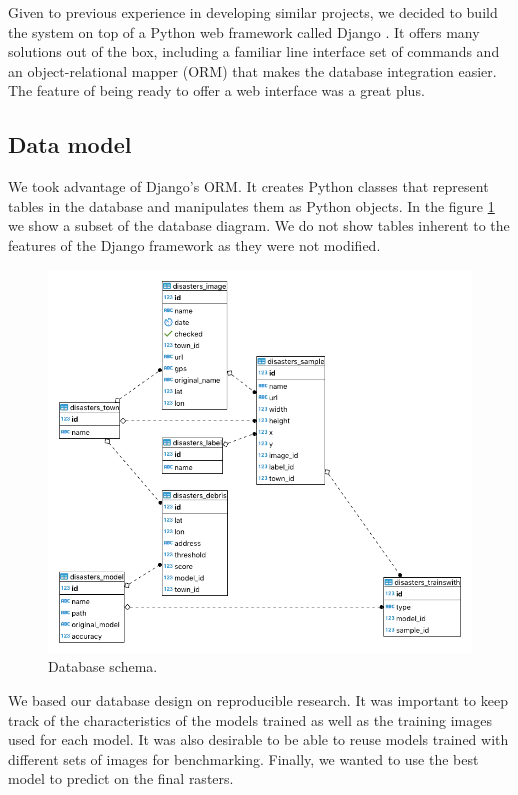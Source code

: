 Given to previous experience in developing similar projects, we decided to build the system on top of a Python web framework called Django \cite{django}. It offers many solutions out of the box, including a familiar line interface set of commands and an object-relational mapper (ORM) that makes the database integration easier. The feature of being ready to offer a web interface was a great plus.\\


\subsection{Data model}

We took advantage of Django's ORM. It creates Python classes that represent tables in the database and manipulates them as Python objects. In the figure \ref{fig:database} we show a subset of the database diagram. We do not show tables inherent to the features of the Django framework as they were not modified.\\

\begin{figure}[!ht]
  \centering
  \includegraphics[width=1\textwidth]{images/database.png}
  \caption{Database schema.}
  \label{fig:database}
\end{figure}

We based our database design on reproducible research. It was important to keep track of the characteristics of the models trained as well as the training images used for each model. It was also desirable to be able to reuse models trained with different sets of images for benchmarking. Finally, we wanted to use the best model to predict on the final rasters.\\

